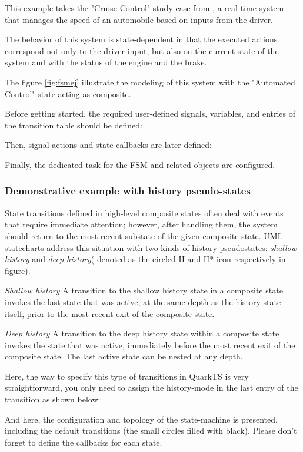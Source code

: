 This example takes the "Cruise Control" study case from \cite{gomaa}, a real-time system that manages the speed of an automobile based on inputs from the driver. 

The behavior of this system is state-dependent in that the executed actions correspond not only to the driver input, but also on the current state of the system and with the status of the engine and the brake. 

The figure \ref{fig:fsmej} illustrate the modeling of this system with the "Automated Control" state acting as composite.
\medskip

Before getting started, the required user-defined signals, variables, and entries of the transition table should be defined:
\medskip



Then, signal-actions and state callbacks are later defined:
\medskip



Finally, the dedicated task for the FSM and related objects are configured.
\medskip


\subsubsection{Demonstrative example with history pseudo-states} 

State transitions defined in high-level composite states often deal with events that require immediate attention; however, after handling them, the system should return to the most recent substate of the given composite state.  UML statecharts address this situation with two kinds of history pseudostates: \textit{shallow history} and \textit{deep history}( denoted as the circled H and H* icon respectively in figure).



\textit{Shallow history} A transition to the shallow history state in a composite state invokes the last state that was active, at the same depth as the history state itself, prior to the most recent exit of the composite state. 

\textit{Deep history} A transition to the deep history state within a composite state invokes the state that was active, immediately before the most recent exit of the composite state. The last active state can be nested at any depth. 

Here, the way to specify this type of transitions in QuarkTS is very straightforward, you only need to assign the history-mode in the last entry of the transition as shown below:
\medskip



And here, the configuration and topology of the state-machine is presented, including the default transitions (the small circles filled with black). Please don't forget to define the callbacks for each state.

\medskip
